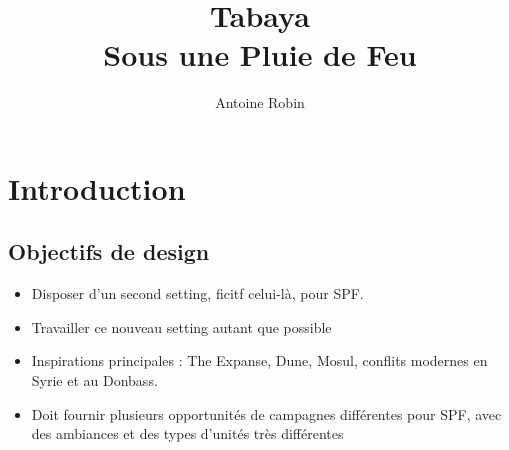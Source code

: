 \documentclass[10pt,a4paper]{book}
\author{ Antoine Robin}
\title{Tabaya \\ {\Large Sous une Pluie de Feu}}
\begin{document}
\maketitle
\tableofcontents
\chapter{Introduction}
\section{Objectifs de design}
\begin{itemize}
\item Disposer d'un second setting, ficitf celui-là, pour SPF.
\item Travailler ce nouveau setting autant que possible
\item Inspirations principales : The Expanse, Dune, Mosul, conflits modernes en Syrie et au Donbass.
\item Doit fournir plusieurs opportunités de campagnes différentes pour SPF, avec des ambiances et des types d'unités très différentes
\end{itemize}
\end{document}
